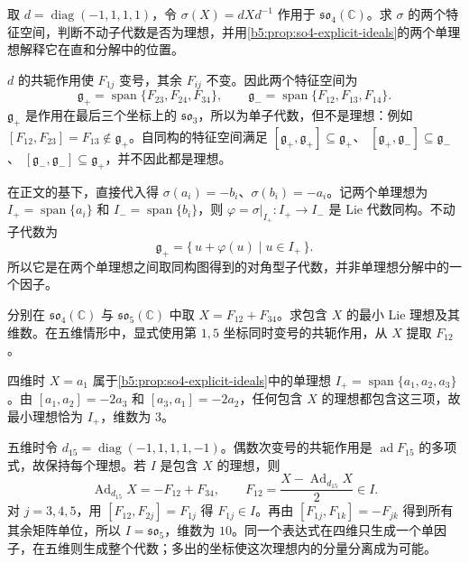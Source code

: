 \begin{exercise}\label{b5:ex:13-so4-explicit}
	取 \(d=\operatorname{diag}(-1,1,1,1)\)，令 \(\sigma(X)=dXd^{-1}\) 作用于 \(\mathfrak{so}_4(\mathbb C)\)。求 \(\sigma\) 的两个特征空间，判断不动子代数是否为理想，并用\cref{b5:prop:so4-explicit-ideals}的两个单理想解释它在直和分解中的位置。
\end{exercise}
\begin{solution}
	\(d\) 的共轭作用使 \(F_{1j}\) 变号，其余 \(F_{ij}\) 不变。因此两个特征空间为
	\[
		\mathfrak g_+=\operatorname{span}\{F_{23},F_{24},F_{34}\},\qquad \mathfrak g_-=\operatorname{span}\{F_{12},F_{13},F_{14}\}.
	\]
	\(\mathfrak g_+\) 是作用在最后三个坐标上的 \(\mathfrak{so}_3\)，所以为单子代数，但不是理想：例如 \([F_{12},F_{23}]=F_{13}\notin\mathfrak g_+\)。自同构的特征空间满足 \([\mathfrak g_+,\mathfrak g_+]\subseteq\mathfrak g_+\)、 \([\mathfrak g_+,\mathfrak g_-]\subseteq\mathfrak g_-\)、 \([\mathfrak g_-,\mathfrak g_-]\subseteq\mathfrak g_+\)，并不因此都是理想。

	在正文的基下，直接代入得 \(\sigma(a_i)=-b_i\)、\(\sigma(b_i)=-a_i\)。记两个单理想为 \(I_+=\operatorname{span}\{a_i\}\) 和 \(I_-=\operatorname{span}\{b_i\}\)，则 \(\varphi=\sigma|_{I_+}:I_+\to I_-\) 是 Lie 代数同构。不动子代数为
	\[
		\mathfrak g_+=\{\,u+\varphi(u)\mid u\in I_+\,\}.
	\]
	所以它是在两个单理想之间取同构图得到的对角型子代数，并非单理想分解中的一个因子。
\end{solution}

\begin{exercise}\label{b5:ex:13-even-sign-exception}
	分别在 \(\mathfrak{so}_4(\mathbb C)\) 与 \(\mathfrak{so}_5(\mathbb C)\) 中取 \(X=F_{12}+F_{34}\)。求包含 \(X\) 的最小 Lie 理想及其维数。在五维情形中，显式使用第 \(1,5\) 坐标同时变号的共轭作用，从 \(X\) 提取 \(F_{12}\)。
\end{exercise}
\begin{solution}
	四维时 \(X=a_1\) 属于\cref{b5:prop:so4-explicit-ideals}中的单理想 \(I_+=\operatorname{span}\{a_1,a_2,a_3\}\)。由 \([a_1,a_2]=-2a_3\) 和 \([a_3,a_1]=-2a_2\)，任何包含 \(X\) 的理想都包含这三项，故最小理想恰为 \(I_+\)，维数为 \(3\)。

	五维时令 \(d_{15}=\operatorname{diag}(-1,1,1,1,-1)\)。偶数次变号的共轭作用是 \(\operatorname{ad}F_{15}\) 的多项式，故保持每个理想。若 \(I\) 是包含 \(X\) 的理想，则
	\[
		\operatorname{Ad}_{d_{15}}X=-F_{12}+F_{34},\qquad F_{12}=\frac{X-\operatorname{Ad}_{d_{15}}X}{2}\in I.
	\]
	对 \(j=3,4,5\)，用 \([F_{12},F_{2j}]=F_{1j}\) 得 \(F_{1j}\in I\)。再由 \([F_{1j},F_{1k}]=-F_{jk}\) 得到所有其余矩阵单位，所以 \(I=\mathfrak{so}_5\)，维数为 \(10\)。同一个表达式在四维只生成一个单因子，在五维则生成整个代数；多出的坐标使这次理想内的分量分离成为可能。
\end{solution}

